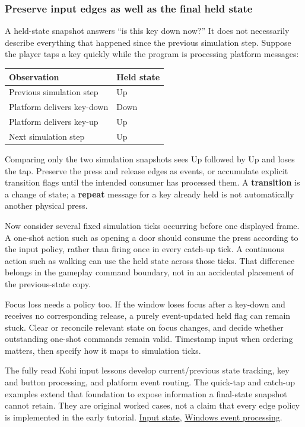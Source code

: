 \subsubsection{Preserve input edges as well as the final held state}\label{05-engine-i-ch014-preserve-input-edges-as-well-as-the-final-held-state}

A held-state snapshot answers ``is this key down now?'' It does not necessarily describe everything that happened since the previous simulation step. Suppose the player taps a key quickly while the program is processing platform messages:

{\def\LTcaptype{none} %
\begin{longtable}[]{@{}ll@{}}
\toprule\noalign{}
Observation & Held state \\
\midrule\noalign{}
\endhead
\bottomrule\noalign{}
\endlastfoot
Previous simulation step & Up \\
Platform delivers key-down & Down \\
Platform delivers key-up & Up \\
Next simulation step & Up \\
\end{longtable}
}

Comparing only the two simulation snapshots sees Up followed by Up and loses the tap. Preserve the press and release edges as events, or accumulate explicit transition flags until the intended consumer has processed them. A \textbf{transition} is a change of state; a \textbf{repeat} message for a key already held is not automatically another physical press.

Now consider several fixed simulation ticks occurring before one displayed frame. A one-shot action such as opening a door should consume the press according to the input policy, rather than firing once in every catch-up tick. A continuous action such as walking can use the held state across those ticks. That difference belongs in the gameplay command boundary, not in an accidental placement of the previous-state copy.

Focus loss needs a policy too. If the window loses focus after a key-down and receives no corresponding release, a purely event-updated held flag can remain stuck. Clear or reconcile relevant state on focus changes, and decide whether outstanding one-shot commands remain valid. Timestamp input when ordering matters, then specify how it maps to simulation ticks.

The fully read Kohi input lessons develop current/previous state tracking, key and button processing, and platform event routing. The quick-tap and catch-up examples extend that foundation to expose information a final-state snapshot cannot retain. They are original worked cases, not a claim that every edge policy is implemented in the early tutorial. \href{https://www.youtube.com/watch?v=ZZhfCYNbVp8}{Input state}, \href{https://www.youtube.com/watch?v=6zjpgUX1TRY}{Windows event processing}.

